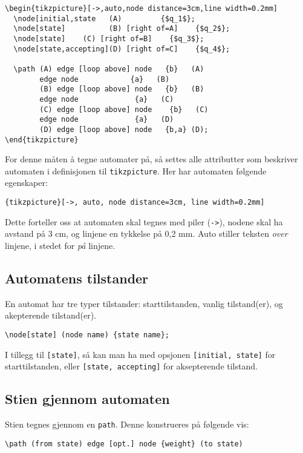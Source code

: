 \documentclass[11pt, a4paper]{article}
\begin{document}
\begin{Verbatim}[fontsize=\small, frame=single]
\begin{tikzpicture}[->,auto,node distance=3cm,line width=0.2mm]
  \node[initial,state   (A) 		{$q_1$};
  \node[state]          (B) [right of=A]    {$q_2$};
  \node[state]	  (C) [right of=B]    {$q_3$};
  \node[state,accepting](D) [right of=C]    {$q_4$};

  \path (A) edge [loop above] node 	 {b}   (A)
	    edge node      		 {a}   (B)
        (B) edge [loop above] node 	 {b}   (B)
	    edge node   	  	  {a}   (C)
        (C) edge [loop above] node	  {b}   (C)
	    edge node 	    	  {a}   (D)
        (D) edge [loop above] node 	 {b,a} (D);
\end{tikzpicture}
\end{Verbatim}
For denne måten å tegne automater på, så settes alle attributter som beskriver automaten i definisjonen til \texttt{tikzpicture}. 
Her har automaten følgende egenskaper:
\begin{center}
\texttt{\{tikzpicture\}[->, auto, node distance=3cm, line width=0.2mm]}
\end{center}
Dette forteller oss at automaten skal tegnes med piler (\texttt{->}), nodene skal ha avstand på 3 cm, og linjene en tykkelse på 0,2 mm. Auto stiller teksten \textit{over} linjene, i stedet for \textit{på} linjene.

\subsection{Automatens tilstander} En automat har tre typer tilstander: starttilstanden, vanlig tilstand(er), og akepterende tilstand(er).

\begin{Verbatim}[fontsize=\small]
\node[state] (node name) {state name};
\end{Verbatim}

I tillegg til \texttt{[state]}, så kan man ha med opsjonen \texttt{[initial, state]} for starttilstanden, eller \texttt{[state, accepting]} for aksepterende tilstand.

\subsection{Stien gjennom automaten}
Stien tegnes gjennom en \texttt{path}. Denne konstrueres på følgende vis:

\begin{Verbatim}[fontsize=\small]
\path (from state) edge [opt.] node {weight} (to state)
\end{Verbatim}
\end{document}
